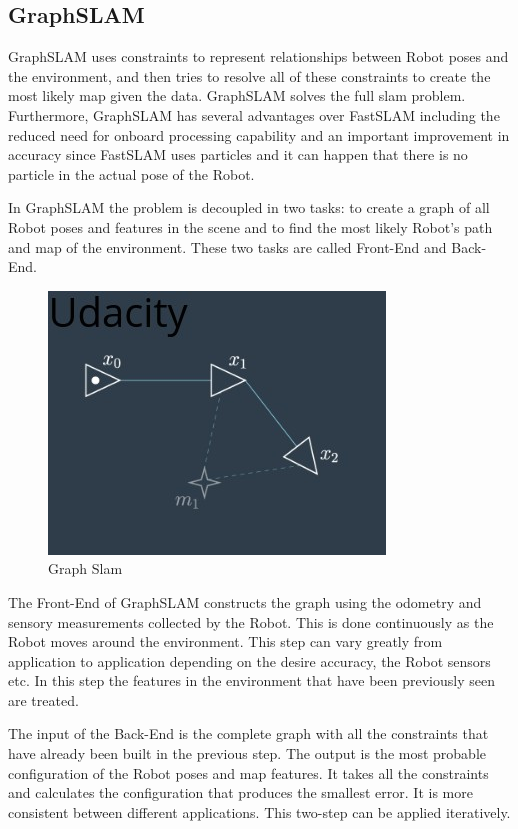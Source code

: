 \documentclass[10pt,journal,compsoc]{IEEEtran}
\begin{document}
\subsection{GraphSLAM}
GraphSLAM uses constraints to represent relationships between Robot poses and the environment, and then tries to resolve all of these constraints to create the most likely map given the data. GraphSLAM solves the full slam problem. Furthermore, GraphSLAM has several advantages over FastSLAM including the reduced need for onboard processing capability and an important improvement in accuracy since FastSLAM uses particles and it can happen that there is no particle in the actual pose of the Robot. 

In GraphSLAM the problem is decoupled in two tasks: to create a graph of all Robot poses and features in the scene and to find the most likely Robot's path and map of the environment. These two tasks are called Front-End and Back-End.

\begin{figure}[h]
\centering
\includegraphics[scale=0.5]{Slam}
\caption{Graph Slam}
\label{fig:world}
\end{figure}


The Front-End of GraphSLAM constructs the graph using the odometry and sensory measurements collected by the Robot. This is done continuously as the Robot moves around the environment. This step can vary greatly from application to application depending on the desire accuracy, the Robot sensors etc. In this step the features in the environment that have been previously seen are treated. 

The input of the Back-End is the complete graph with all the constraints that have already been built in the previous step. The output is the most probable configuration of the Robot poses and map features. It takes all the constraints and calculates the configuration that produces the smallest error. It is more consistent between different applications. This two-step can be applied iteratively.
\end{document}

